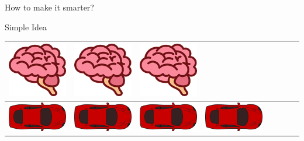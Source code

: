 \documentclass{do}
\begin{document}
\begin{frame}{How to make it smarter?}
\begin{exampleblock}{Simple Idea}
\begin{tabular}{c|c|c|c|c|c|c|c}
            \includegraphics[scale=0.66]{brain0.png}&
            \includegraphics[scale=0.66]{brain0.png}&
            \includegraphics[scale=0.66]{brain0.png}\\ \hline
            \includegraphics[scale=0.30]{car.png}&
            \includegraphics[scale=0.30]{car.png}&
            \includegraphics[scale=0.30]{car.png}&
            \includegraphics[scale=0.30]{car.png}&

\end{tabular}
\end{exampleblock}
\end{frame}
\end{document}
